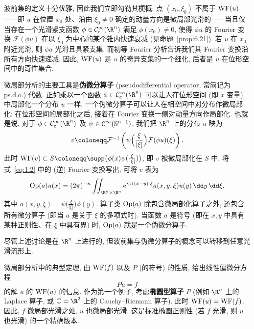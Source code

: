 波前集的定义十分优雅, 因此我们立即勾勒其梗概: 点 $(x_0, \xi_0)$ 不属于 $\operatorname{WF}(u)$——即 $u$ 在位置 $x_0$ 处、沿由 $\xi_0 \neq 0$ 确定的动量方向是微局部光滑的——当且仅当存在一个光滑紧支函数 $\phi \in \SmoothComp(\R^n)$ 满足 $\phi(x_0) \neq 0$, 使得 $\phi u$ 的 Fourier 变换 $\mathcal{F}(\phi u)$ 在以 $\xi_0$ 为中心的某个锥内快速衰减 (见命题~\ref{prop:6.21}). 若 $u$ 在 $x_0$ 附近光滑, 则 $\phi u$ 光滑且具紧支集, 而初等 Fourier 分析告诉我们其 Fourier 变换沿所有方向快速递减. 因此, $\operatorname{WF}(u)$ 是 $u$ 的奇异支集的一个细化, 后者是 $u$ 在位形空间中的奇性集合.

微局部分析的主要工具是\textbf{伪微分算子} (pseudodifferential operator, 常简记为 ps.d.o.) 代数. 正如乘以一个函数 $\phi \in \SmoothComp(\R^n)$ 可以让人在位形空间 (即 $x$ 变量) 中局部化一个分布 $u$ 一样, 一个伪微分算子可以让人在相空间中对分布作微局部化: 在位形空间的局部化之后, 接着在 Fourier 变换一侧对动量方向作局部化. 也就是说, 对于 $\phi \in \SmoothComp(\R^n)$ 及 $\psi \in \mathcal{C}^\infty(\mathbb{S}^{n-1})$, 我们把 $\R^n$ 上的分布 $u$ 映为
\begin{equation}\label{eq:1.2}
    v \defeq \mathcal{F}^{-1} \left( \psi\Bigl(\frac{\xi}{|\xi|}\Bigr) \mathcal{F}(\phi u)(\xi) \right).
\end{equation}
此时 $\WF(v) \subset S \defeq \supp\bigl(\phi(x) \psi(\frac{\xi}{|\xi|})\bigr)$, 即 $v$ 被微局部化在 $S$ 中. 将式~\eqref{eq:1.2} 中的 (逆) Fourier 变换写出, 可将 $v$ 表为
\begin{equation}\label{eq:1.3}
    \Op(a) u(x) = (2\pi)^{-n} \iint_{\R^n \times \R^n} \ee^{\ii (x-y)\cdot\xi} a(x, y, \xi) u(y) \,\dd y \,\dd\xi,
\end{equation}
其中 $a(x, y, \xi) = \psi\bigl(\frac{\xi}{|\xi|}\bigr) \phi(y)$. 算子类 $\operatorname{Op}(a)$ 除包含微局部化算子之外, 还包含所有微分算子 (即当 $a$ 是关于 $\xi$ 的多项式时). 当函数 $a$ 是符号 (即在 $x, y$ 中具有某种正则性、在 $\xi$ 中具有界) 时, $\operatorname{Op}(a)$ 就是一个伪微分算子.

尽管上述讨论是在 $\R^n$ 上进行的, 但波前集与伪微分算子的概念可以转移到任意光滑流形上.

微局部分析中的典型定理, 由 $\operatorname{WF}(f)$ 以及 $P$ (的符号) 的性质, 给出线性偏微分方程
\begin{equation}\label{eq:1.4}
    P u = f
\end{equation}
的解 $u$ 的 $\operatorname{WF}(u)$ 的信息. 作为第一个例子, 考虑\textbf{椭圆型算子} $P$ (例如 $\R^n$ 上的 Laplace 算子, 或 $\mathbb{C} = \R^2$ 上的 Cauchy--Riemann 算子). 此时 $\operatorname{WF}(u) = \operatorname{WF}(f)$. 因此, $f$ 微局部光滑之处, $u$ 也微局部光滑. 这是标准椭圆正则性 (若 $f$ 光滑, 则 $u$ 也光滑) 的一个精确版本.

